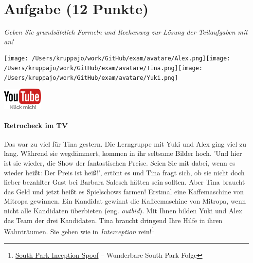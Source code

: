 \documentclass[a4paper, 9pt]{scrartcl}\usepackage[]{graphicx}\usepackage[]{xcolor}
\begin{document}
  
\clearpage

\section{Aufgabe \hfill (12 Punkte)}

\textit{Geben Sie grundsätzlich Formeln und Rechenweg zur Lösung der Teilaufgaben mit an!} \\[1Ex]
 

 
\ifcollection
\begin{flushright}
\tiny\vspace{-3Ex}
\textbf{\examinhaltstart}
\exammodulemathstat
\vspace{-4Ex}
\end{flushright}
\begin{minipage}[t]{0.5\textwidth}
\texttt{[image: /Users/kruppajo/work/GitHub/exam/avatare/Alex.png]}\hspace{-4mm}\texttt{[image: /Users/kruppajo/work/GitHub/exam/avatare/Tina.png]}\hspace{-4mm}\texttt{[image: /Users/kruppajo/work/GitHub/exam/avatare/Yuki.png]}
\end{minipage}
\begin{minipage}[t]{0.5\textwidth}
\hfill
\href{https://youtu.be/8Pb2sKUIMyk}{\includegraphics[width = 2cm]{img/youtube}}
\end{minipage}
\fi



\ifcollection
\paragraph{Retrocheck im TV}
\fi




Das war zu viel für Tina gestern. Die Lerngruppe mit Yuki und Alex ging viel zu lang. Während sie wegdämmert, kommen in ihr seltsame Bilder hoch. 'Und hier ist sie wieder, die Show der fantastischen Preise. Seien Sie mit dabei, wenn es wieder heißt: Der Preis ist heiß!', ertönt es und Tina fragt sich, ob sie nicht doch lieber bezahlter Gast bei Barbara Salesch hätten sein sollten. Aber Tina braucht das Geld und jetzt heißt es Spielschows farmen! Erstmal eine Kaffemaschine von Mitropa gewinnen. Ein Kandidat gewinnt die Kaffeemaschine von Mitropa, wenn nicht alle Kandidaten überbieten (eng. \textit{outbid}). Mit Ihnen bilden Yuki und Alex das Team der drei Kandidaten. Tina braucht dringend Ihre Hilfe in ihren Wahnträumen. Sie gehen wie in \textit{Interception} rein!\footnote{\href{https://www.youtube.com/watch?v=3RhxyHMs-w8}{South Park Inception Spoof} -- Wunderbare South Park Folge}
\end{document}
